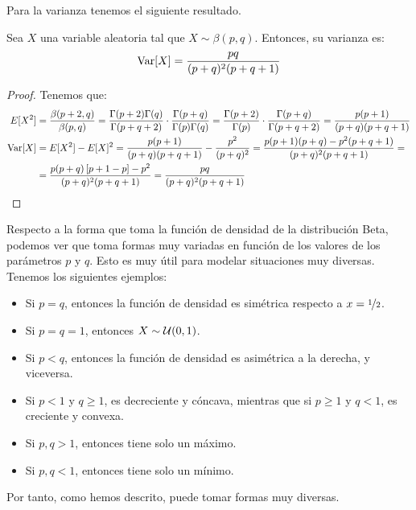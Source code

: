 Para la varianza tenemos el siguiente resultado.
\begin{prop}
    Sea $X$ una variable aleatoria tal que $X\sim \beta(p,q)$. Entonces, su varianza es:
    \begin{equation*}
        \operatorname{Var}[X] = \dfrac{pq}{(p+q)^2(p+q+1)}
    \end{equation*}
\end{prop}
\begin{proof} Tenemos que:
    \begin{align*}
        E[X^2] &= \dfrac{\beta(p+2,q)}{\beta(p,q)}
        = \dfrac{\Gamma(p+2)\Gamma(q)}{\Gamma(p+q+2)} \cdot \dfrac{\Gamma(p+q)}{\Gamma(p)\Gamma(q)} = \dfrac{\Gamma(p+2)}{\Gamma(p)} \cdot \dfrac{\Gamma(p+q)}{\Gamma(p+q+2)} = \dfrac{p(p+1)}{(p+q)(p+q+1)} \\
        \operatorname{Var}[X] &= E[X^2] - E[X]^2 = \dfrac{p(p+1)}{(p+q)(p+q+1)} - \dfrac{p^2}{(p+q)^2}
        = \dfrac{p(p+1)(p+q) -p^2(p+q+1)}{(p+q)^2(p+q+1)} =\\
        &= \dfrac{p(p+q)\left[ p+1-p \right]-p^2}{(p+q)^2(p+q+1)} = \dfrac{pq}{(p+q)^2(p+q+1)}
    \end{align*}
\end{proof}


Respecto a la forma que toma la función de densidad de la distribución Beta, podemos ver que toma formas muy variadas en función de los valores de los parámetros $p$ y $q$.
Esto es muy útil para modelar situaciones muy diversas. Tenemos los siguientes ejemplos:
\begin{itemize}
    \item Si $p=q$, entonces la función de densidad es simétrica respecto a $x=\nicefrac{1}{2}$.
    \item Si $p=q=1$, entonces $X\sim \mathcal{U}(0,1)$.
    \item Si $p<q$, entonces la función de densidad es asimétrica a la derecha, y viceversa.
    \item Si $p<1$ y $q\geq 1$, es decreciente y cóncava, mientras que si $p\geq 1$ y $q<1$, es creciente y convexa.
    \item Si $p,q>1$, entonces tiene solo un máximo.
    \item Si $p,q<1$, entonces tiene solo un mínimo.
\end{itemize}

Por tanto, como hemos descrito, puede tomar formas muy diversas.